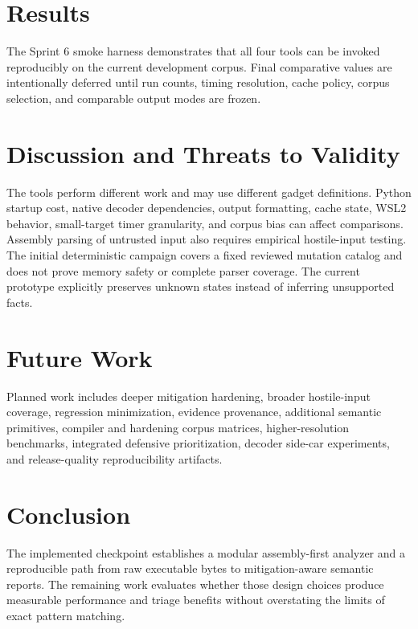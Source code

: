 \documentclass[conference]{IEEEtran}
\begin{document}
\section{Results}
The Sprint 6 smoke harness demonstrates that all four tools can be invoked reproducibly on the current development corpus. Final comparative values are intentionally deferred until run counts, timing resolution, cache policy, corpus selection, and comparable output modes are frozen.

\section{Discussion and Threats to Validity}
The tools perform different work and may use different gadget definitions. Python startup cost, native decoder dependencies, output formatting, cache state, WSL2 behavior, small-target timer granularity, and corpus bias can affect comparisons. Assembly parsing of untrusted input also requires empirical hostile-input testing. The initial deterministic campaign covers a fixed reviewed mutation catalog and does not prove memory safety or complete parser coverage. The current prototype explicitly preserves unknown states instead of inferring unsupported facts.

\section{Future Work}
Planned work includes deeper mitigation hardening, broader hostile-input coverage, regression minimization, evidence provenance, additional semantic primitives, compiler and hardening corpus matrices, higher-resolution benchmarks, integrated defensive prioritization, decoder side-car experiments, and release-quality reproducibility artifacts.

\section{Conclusion}
The implemented checkpoint establishes a modular assembly-first analyzer and a reproducible path from raw executable bytes to mitigation-aware semantic reports. The remaining work evaluates whether those design choices produce measurable performance and triage benefits without overstating the limits of exact pattern matching.



\end{document}
